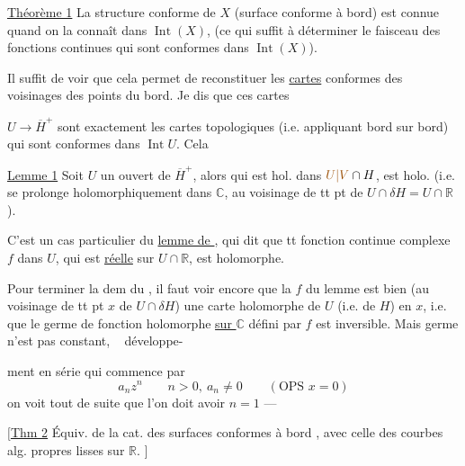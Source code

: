 \uline{Théorème 1} La structure conforme de $X$ (surface
conforme à bord) est connue quand on
la connaît dans $\operatorname{Int}(X)$, (ce qui suffit à
déterminer le faisceau des fonctions  continues
qui sont conformes dans $\operatorname{Int}(X)$).

Il suffit de voir que cela permet de
reconstituer les \uline{cartes} conformes des voisinages
des points du bord. Je dis que ces cartes

$U\longrightarrow\overline H^+$ sont exactement les cartes topologiques
(i.e. 
appliquant bord sur bord) qui sont conformes dans $\operatorname{Int}U$.
Cela 

\uline{Lemme 1} Soit $U$ un ouvert de $\overline H^+$, alors 
 qui est hol.
dans $\unsure{U|V}\cap H$, est holo. (i.e. se prolonge holomorphiquement
dans $\mathbb C$, au voisinage de tt
pt de $U\cap\delta H=U\cap\mathbb R$).

C'est un cas particulier du \uline{lemme de
}, qui dit que tt fonction 
continue complexe $f$ dans $U$, qui est
\uline{réelle} sur $U\cap\mathbb R$, est holomorphe.

Pour terminer la dem du , il faut
voir encore que la $f$ du lemme est bien
(au voisinage de tt pt $x$ de $U\cap\delta H$) une
carte holomorphe de  $U$ (i.e. de $H$) en $x$,
i.e. que le germe  de fonction holomorphe
\uline{sur $\mathbb C$} défini par $f$ est inversible. Mais 
germe n'est pas constant, \  développe-

ment en série qui commence par
\[
a_nz^n\qquad n>0,\ a_n\ne0\qquad(\text{OPS }x=0)
\]
on voit tout de suite que l'on doit avoir
$n=1$ ---


\noindent$\bigl[$\uline{Thm 2} Équiv. de la cat. des surfaces conformes
à bord , avec celle des courbes alg. propres
lisses sur $\mathbb R$. $\bigr]$

